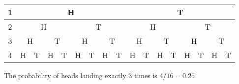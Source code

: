 \documentclass[a4paper,man,natbib]{apa6}
\begin{document}
\begin{tabular}{|c|cccccccc|cccccccc|}
	\hline
	1 &
	\multicolumn{8}{c|}{H} &
	\multicolumn{8}{c|}{T} \\ \hline
	2 &
	\multicolumn{4}{c|}{H} &
	\multicolumn{4}{c|}{T} &
	\multicolumn{4}{c|}{H} &
	\multicolumn{4}{c|}{T} \\ \hline
	3 &
	\multicolumn{2}{c|}{H} &
	\multicolumn{2}{c|}{T} &
	\multicolumn{2}{c|}{H} &
	\multicolumn{2}{c|}{T} &
	\multicolumn{2}{c|}{H} &
	\multicolumn{2}{c|}{T} &
	\multicolumn{2}{c|}{H} &
	\multicolumn{2}{c|}{T} \\ \hline
	4 &
	\multicolumn{1}{c|}{H} &
	\multicolumn{1}{c|}{\cellcolor[HTML]{34FF34}T} &
	\multicolumn{1}{c|}{\cellcolor[HTML]{34FF34}H} &
	\multicolumn{1}{c|}{T} &
	\multicolumn{1}{c|}{\cellcolor[HTML]{34FF34}H} &
	\multicolumn{1}{c|}{T} &
	\multicolumn{1}{c|}{H} &
	T &
	\multicolumn{1}{c|}{\cellcolor[HTML]{34FF34}H} &
	\multicolumn{1}{c|}{T} &
	\multicolumn{1}{c|}{H} &
	\multicolumn{1}{c|}{T} &
	\multicolumn{1}{c|}{H} &
	\multicolumn{1}{c|}{T} &
	\multicolumn{1}{c|}{H} &
	T \\ \hline
\end{tabular}

\vspace{1em}
The probability of heads landing exactly 3 times is $4/16 = 0.25$


\end{document}
